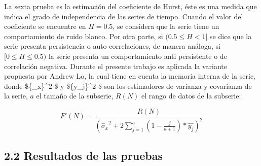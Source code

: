 \documentclass[11pt]{article}
\begin{document}
    La sexta prueba es la estimación del coeficiente de Hurst, éste es una
medida que indica el grado de independencia de las series de tiempo.
Cuando el valor del coeficiente se encuentre en \(H=0.5\), se considera
que la serie tiene un comportamiento de ruido blanco. Por otra parte, si
\((0.5≤H<1]\) se dice que la serie presenta persistencia o auto
correlaciones, de manera análoga, si \([0≤H≤0.5)\) la serie presenta un
comportamiento anti persistente o de correlación negativa. Durante el
presente trabajo es aplicada la variante propuesta por Andrew Lo, la
cual tiene en cuenta la memoria interna de la serie, donde
\$\{\hat\sigma\_x\}\^{}2 \$ y \$\{\hat y\_j\}\^{}2 \$ son los
estimadores de varianza y covarianza de la serie, \(a\) el tamaño de la
subserie, \(R(N)\) el rango de datos de la subserie:

\begin{equation*}
F'(N)= \frac{R(N)}{({\hat\sigma_x}^2 +2\sum_{j=1}^a(1-\frac{j}{a+1})*\hat{y_j})^2}
\end{equation*}

    \hypertarget{resultados-de-las-pruebas}{%
\subsection{2.2 Resultados de las
pruebas}\label{resultados-de-las-pruebas}}
\end{document}
